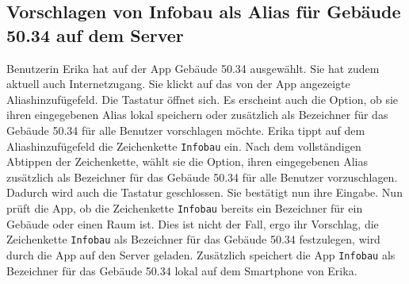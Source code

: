 \subsection{Vorschlagen von Infobau als Alias für Gebäude 50.34 auf dem Server}

Benutzerin Erika hat auf der App Gebäude 50.34 ausgewählt. 
Sie hat zudem aktuell auch Internetzugang. 
Sie klickt auf das von der App angezeigte Aliashinzufügefeld. 
Die Tastatur öffnet sich.  
Es erscheint auch die Option, ob sie ihren eingegebenen Alias lokal speichern oder zusätzlich als Bezeichner für das Gebäude 50.34 für alle Benutzer vorschlagen möchte. 
Erika tippt auf dem Aliashinzufügefeld die Zeichenkette \texttt{Infobau} ein.
Nach dem vollständigen Abtippen der Zeichenkette, wählt sie die Option, ihren eingegebenen Alias zusätzlich als Bezeichner für das Gebäude 50.34 für alle Benutzer vorzuschlagen. 
Dadurch wird auch die Tastatur geschlossen. 
Sie bestätigt nun ihre Eingabe. 
Nun prüft die App, ob die Zeichenkette \texttt{Infobau} bereits ein Bezeichner für ein Gebäude oder einen Raum ist. 
Dies ist nicht der Fall, ergo ihr Vorschlag, die Zeichenkette \texttt{Infobau} als Bezeichner für das Gebäude 50.34 festzulegen, wird durch die App auf den Server geladen. 
Zusätzlich speichert die App \texttt{Infobau} als Bezeichner für das Gebäude 50.34 lokal auf dem Smartphone von Erika.